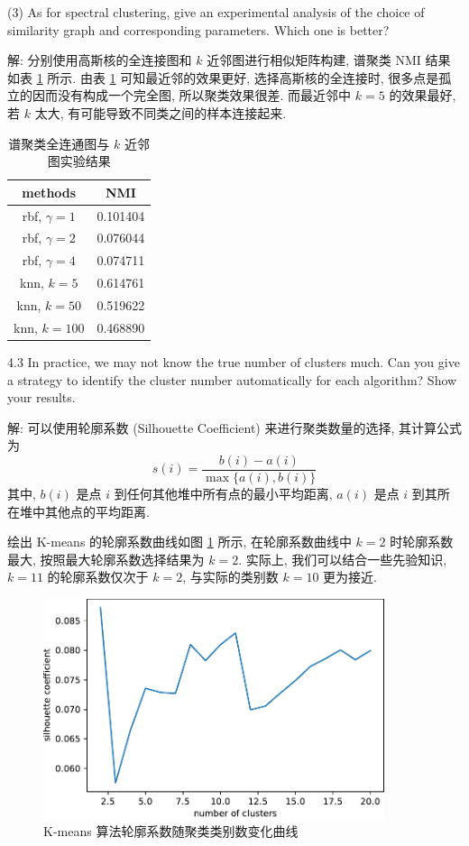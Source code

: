 \documentclass{article}
\begin{document}
(3) As for spectral clustering, give an experimental analysis of the choice of similarity graph and corresponding parameters. Which one is better?

解: 分别使用高斯核的全连接图和 $k$ 近邻图进行相似矩阵构建, 谱聚类 NMI 结果如表 \ref{tab:spectral_nmi} 所示. 由表 \ref{tab:spectral_nmi} 可知最近邻的效果更好, 选择高斯核的全连接时, 很多点是孤立的因而没有构成一个完全图, 所以聚类效果很差. 而最近邻中 $k=5$ 的效果最好, 若 $k$ 太大, 有可能导致不同类之间的样本连接起来.

\begin{table}[htbp]
  \centering
  \caption{谱聚类全连通图与 $k$ 近邻图实验结果}
  \label{tab:spectral_nmi}
  \begin{tabular}{cc}
    \toprule
    methods & NMI \\
    \midrule
    rbf, $\gamma=1$ &  0.101404 \\
    rbf, $\gamma=2$ &  0.076044 \\
    rbf, $\gamma=4$ &  0.074711 \\
    knn, $k=5$     &  0.614761 \\
    knn, $k=50$    &  0.519622 \\
    knn, $k=100$   &  0.468890 \\
    \bottomrule
  \end{tabular}
\end{table}

4.3 In practice, we may not know the true number of clusters much. Can you give a strategy to identify the cluster number automatically for each algorithm? Show your results.

解: 可以使用轮廓系数 (Silhouette Coefficient) \cite{silhouette} 来进行聚类数量的选择, 其计算公式为
\begin{equation}
  s(i)=\frac{b(i)-a(i)}{\max\{a(i),b(i)\}}
\end{equation}
其中, $b(i)$ 是点 $i$ 到任何其他堆中所有点的最小平均距离, $a(i)$ 是点 $i$ 到其所在堆中其他点的平均距离.

绘出 K-means 的轮廓系数曲线如图 \ref{fig:kmeans_silhouette} 所示, 在轮廓系数曲线中
$k=2$ 时轮廓系数最大, 按照最大轮廓系数选择结果为 $k=2$. 实际上, 我们可以结合一些先验知识, $k=11$ 的轮廓系数仅次于 $k=2$, 与实际的类别数 $k=10$ 更为接近.

\begin{figure}[htbp]
  \centering
  \includegraphics[width=10cm]{kmeans_silhouette.pdf}
  \caption{K-means 算法轮廓系数随聚类类别数变化曲线}
  \label{fig:kmeans_silhouette}
\end{figure}
\end{document}
